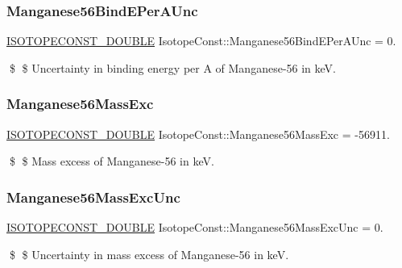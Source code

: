 \subsubsection{\texorpdfstring{Manganese56\+Bind\+E\+Per\+A\+Unc}{Manganese56BindEPerAUnc}}
{\footnotesize\ttfamily \mbox{\hyperlink{group___isotope_const-_macros_ga8f45a7272ce02c0b4c65c44636ed719a}{I\+S\+O\+T\+O\+P\+E\+C\+O\+N\+S\+T\+\_\+\+D\+O\+U\+B\+LE}} Isotope\+Const\+::\+Manganese56\+Bind\+E\+Per\+A\+Unc = 0.}

\$ \$ Uncertainty in binding energy per A of Manganese-\/56 in keV. \mbox{\label{group___isotope_const-_manganese-_mn56_ga31b08f8dcbd6c6098d9f5258dcc95f66}} 
\subsubsection{\texorpdfstring{Manganese56\+Mass\+Exc}{Manganese56MassExc}}
{\footnotesize\ttfamily \mbox{\hyperlink{group___isotope_const-_macros_ga8f45a7272ce02c0b4c65c44636ed719a}{I\+S\+O\+T\+O\+P\+E\+C\+O\+N\+S\+T\+\_\+\+D\+O\+U\+B\+LE}} Isotope\+Const\+::\+Manganese56\+Mass\+Exc = -\/56911.}

\$ \$ Mass excess of Manganese-\/56 in keV. \mbox{\label{group___isotope_const-_manganese-_mn56_ga33704ccb52d9f35214508bcb2613638c}} 
\subsubsection{\texorpdfstring{Manganese56\+Mass\+Exc\+Unc}{Manganese56MassExcUnc}}
{\footnotesize\ttfamily \mbox{\hyperlink{group___isotope_const-_macros_ga8f45a7272ce02c0b4c65c44636ed719a}{I\+S\+O\+T\+O\+P\+E\+C\+O\+N\+S\+T\+\_\+\+D\+O\+U\+B\+LE}} Isotope\+Const\+::\+Manganese56\+Mass\+Exc\+Unc = 0.}

\$ \$ Uncertainty in mass excess of Manganese-\/56 in keV. \mbox{\label{group___isotope_const-_manganese-_mn56_gaba69235d93ad4fd325dc299d292aa6ae}} 
